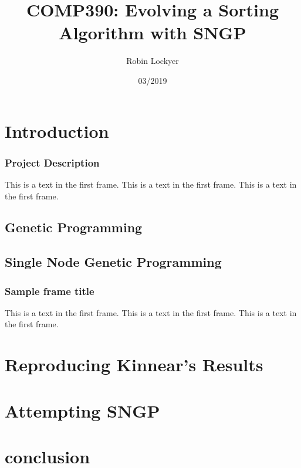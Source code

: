 \documentclass{beamer}
\title{COMP390: Evolving a Sorting Algorithm with SNGP}
\author{Robin Lockyer}
\institute{University of Liverpool}
\date{03/2019}
\begin{document}
	
	\frame{\titlepage}
	
	\frame{\tableofcontents}
	
	\section{Introduction}
	
		\begin{frame}
			\frametitle{Project Description}
			This is a text in the first frame. This is a text in the first frame. This is a text in the first frame.
		\end{frame}
	
		\subsection{Genetic Programming}
		
		
		\subsection{Single Node Genetic Programming}
	
			\begin{frame}
				\frametitle{Sample frame title}
				This is a text in the first frame. This is a text in the first frame. This is a text in the first frame.
			\end{frame}
	
	\section{Reproducing Kinnear's Results}
	
	\section{Attempting SNGP}
	
	\section{conclusion}
		
\end{document}
